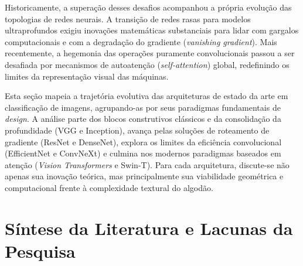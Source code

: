     Historicamente, a superação desses desafios acompanhou a própria evolução das topologias de redes neurais. A transição de redes rasas para modelos ultraprofundos exigiu inovações matemáticas substanciais para lidar com gargalos computacionais e com a degradação do gradiente (\textit{vanishing gradient}). Mais recentemente, a hegemonia das operações puramente convolucionais passou a ser desafiada por mecanismos de autoatenção (\textit{self-attention}) global, redefinindo os limites da representação visual das máquinas.

    Esta seção mapeia a trajetória evolutiva das arquiteturas de estado da arte em classificação de imagens, agrupando-as por seus paradigmas fundamentais de \textit{design}. A análise parte dos blocos construtivos clássicos e da consolidação da profundidade (VGG e Inception), avança pelas soluções de roteamento de gradiente (ResNet e DenseNet), explora os limites da eficiência convolucional (EfficientNet e ConvNeXt) e culmina nos modernos paradigmas baseados em atenção (\textit{Vision Transformers} e Swin-T). Para cada arquitetura, discute-se não apenas sua inovação teórica, mas principalmente sua viabilidade geométrica e computacional frente à complexidade textural do algodão.

    

\section{Síntese da Literatura e Lacunas da Pesquisa}

    
